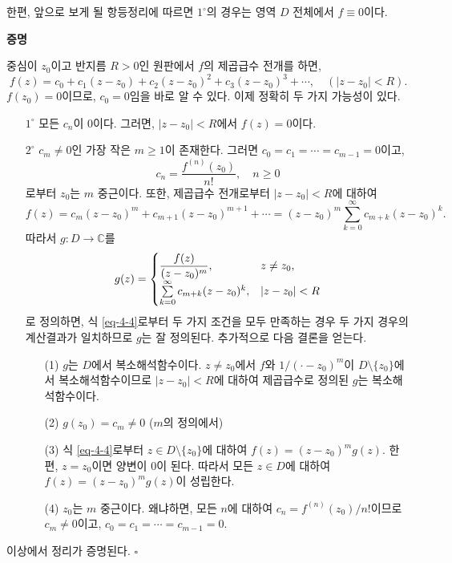 한편, 앞으로 보게 될 항등정리에 따르면
$1^\circ$의 경우는 영역 $D$ 전체에서 $f\equiv 0$이다.

{\bf 증명}

중심이 $z_0$이고 반지름 $R>0$인 원판에서 $f$의 제곱급수 전개를 하면,
\[
f(z) = c_0 + c_1(z-z_0) + c_2(z-z_0)^2 + c_3(z-z_0)^3 + \cdots, \quad
(|z-z_0| <R).
\]
$f(z_0)=0$이므로, $c_0=0$임을 바로 알 수 있다. 
이제 정확히 두 가지 가능성이 있다.
\begin{itemize}
\item[$1^\circ$] 모든 $c_n$이 $0$이다. 그러면, $|z-z_0| <R$에서 $f(z)=0$이다.
\item[$2^\circ$] $c_m\ne 0$인 가장 작은 $m\ge1$이 존재한다.
그러면 $c_0=c_1=\cdots = c_{m-1}=0$이고,
\[
c_n = \dfrac{f^{(n)}(z_0)}{n!}, \quad n\ge0
\]
로부터 $z_0$는 $m$ 중근이다.
또한, 제곱급수 전개로부터 $|z-z_0|<R$에 대하여
\begin{equation} \label{eq-4-4}
f(z) = c_m(z-z_0)^m + c_{m+1}(z-z_0)^{m+1} + \cdots
= (z-z_0)^m \sum_{k=0}^\infty c_{m+k} (z-z_0)^k.
\end{equation}
따라서 $g:D\to \mathbb C$를 
\[
g(z) = \begin{cases}
\displaystyle\frac{f(z)}{(z-z_0)^m}, & z\ne z_0, \\
\sum\limits_{k=0}^\infty c_{m+k} (z-z_0)^k, & |z-z_0|<R
\end{cases}	
\]
로 정의하면,
식 \eqref{eq-4-4}로부터 두 가지 조건을 모두 만족하는 경우
두 가지 경우의 계산결과가 일치하므로
$g$는 잘 정의된다. 추가적으로 다음 결론을 얻는다.
\begin{itemize}
\item[(1)]  $g$는 $D$에서 복소해석함수이다. $z\ne z_0$에서
$f$와 $1/(\cdot - z_0)^m$이 $D\setminus \{z_0\}$에서 복소해석함수이므로
$|z-z_0|<R$에 대하여 제곱급수로 정의된 $g$는 복소해석함수이다.
\item[(2)] $g(z_0) = c_m\ne 0$ ($m$의 정의에서)
\item[(3)] 식 \eqref{eq-4-4}로부터 $z\in D\setminus \{z_0\}$에 대하여
$f(z) = (z-z_0)^mg(z)$. 한편, $z=z_0$이면 양변이 $0$이 된다.
따라서 모든 $z\in D$에 대하여 $f(z) = (z-z_0)^mg(z)$이 성립한다.
\item[(4)] $z_0$는 $m$ 중근이다.
왜냐하면, 모든 $n$에 대하여 $c_n = f^{(n)}(z_0)/n!$이므로
$c_m \ne 0$이고, $c_0 = c_1 = \cdots = c_{m-1}= 0$.
\end{itemize}
\end{itemize}
이상에서 정리가 증명된다. \hfill $\square$

